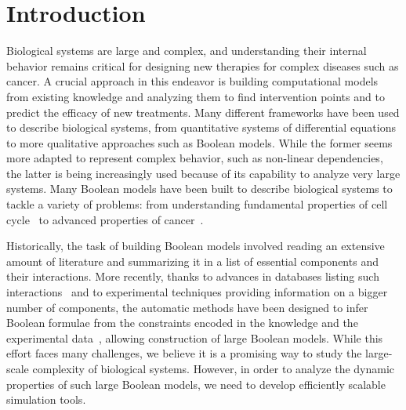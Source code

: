 \documentclass[sn-mathphys-num]{sn-jnl}%
\begin{document}



\maketitle

\section{Introduction}

Biological systems are large and complex, and understanding their internal behavior remains critical for designing new therapies for complex diseases such as cancer.
A crucial approach in this endeavor is building computational models from existing knowledge and analyzing them to find intervention points and to predict the efficacy of new treatments.
Many different frameworks have been used to describe biological systems, from quantitative systems of differential equations to more qualitative approaches such as Boolean models.
While the former seems more adapted to represent complex behavior, such as non-linear dependencies, the latter is being increasingly used because of its capability to analyze very large systems.
Many Boolean models have been built to describe biological systems to tackle a variety of problems: from understanding fundamental properties of cell cycle~\cite{faure2006cellcycle,sizek2019boolean} to advanced properties of cancer~\cite{fumia_carcinogenesis_2013,montagud2022prostate}.

Historically, the task of building Boolean models involved reading an extensive amount of literature and summarizing it in a list of essential components and their interactions.
More recently, thanks to advances in databases listing such interactions~\cite{licata2020signor,turei2016omnipath} and to experimental techniques providing information on a bigger number of components, the automatic methods have been designed to infer Boolean formulae from the constraints encoded in the knowledge and the experimental data~\cite{10.1093/bioinformatics/btaa484,chevalier2020synthesis,benevs2023boolean}, allowing construction of large Boolean models.
While this effort faces many challenges, we believe it is a promising way to study the large-scale complexity of biological systems.
However, in order to analyze the dynamic properties of such large Boolean models, we need to develop efficiently scalable simulation tools.
\end{document}
